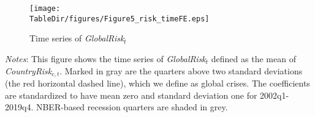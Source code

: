 \documentclass[12pt,oneside,leqno]{article}
\newcommand*{\TableDir}{.}
\begin{document}



\clearpage
\begin{figure}[!h]
\caption{Time series of \textit{GlobalRisk}$_{t}$} \label{fig:globalrisk}
\texttt{[image: \\TableDir/figures/Figure5\_risk\_timeFE.eps]}
\end{figure}
\vspace{-.3in}
\begin{minipage}[t]{.96\textwidth}
\footnotesize\textit{Notes}: This figure shows the time series of \textit{GlobalRisk}$_{t}$ defined as the mean of \textit{CountryRisk}$_{c,t}$. Marked in gray are the quarters above two standard deviations (the red horizontal dashed line), which we define as global crises. The coefficients are standardized to have mean zero and standard deviation one for 2002q1-2019q4. NBER-based recession quarters are shaded in grey.
\end{minipage}



\clearpage
\end{document}
